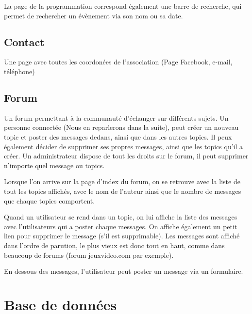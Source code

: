 \documentclass[a4paper, 12pt]{article}
\begin{document}
La page de la programmation correspond également une barre de recherche, qui permet de rechercher un évènement via son nom ou sa date.

\subsection{Contact}
Une page avec toutes les coordonées de l'association (Page Facebook, e-mail, téléphone)

\subsection{Forum}
Un forum permettant à la communauté d'échanger sur différents sujets. Un personne connectée (Nous en reparlerons dans la suite), peut créer un nouveau topic et poster des messages dedans, ainsi que dans les autres topics. Il peux également décider de supprimer ses propres messages, ainsi que les topics qu'il a créer.
Un administrateur dispose de tout les droits sur le forum, il peut supprimer n'importe quel message ou topics.

Lorsque l'on arrive sur la page d'index du forum, on se retrouve avec la liste de tout les topics affichés, avec le nom de l'auteur ainsi que le nombre de messages que chaque topics comportent.

Quand un utilisateur se rend dans un topic, on lui affiche la liste des messages avec l'utilisateurs qui a poster chaque messages. On affiche également un petit lien pour supprimer le message (s'il est supprimable). Les messages sont affiché dans l'ordre de parution, le plus vieux est donc tout en haut, comme dans beaucoup de forums (forum jeuxvideo.com par exemple).

En dessous des messages, l'utilisateur peut poster un message via un formulaire.

\section{Base de données}
\end{document}
